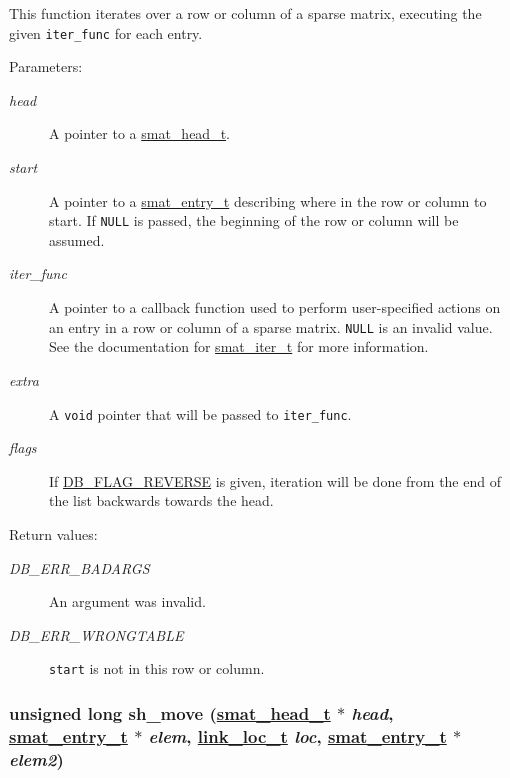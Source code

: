 This function iterates over a row or column of a sparse matrix, executing the given {\tt iter\_\-func} for each entry.\begin{Desc}
\item[Parameters: ]\par
\begin{description}
\item[{\em 
head}]A pointer to a \hyperlink{group__dbprim__smat_a1}{smat\_\-head\_\-t}. \item[{\em 
start}]A pointer to a \hyperlink{group__dbprim__smat_a2}{smat\_\-entry\_\-t} describing where in the row or column to start. If {\tt NULL} is passed, the beginning of the row or column will be assumed. \item[{\em 
iter\_\-func}]A pointer to a callback function used to perform user-specified actions on an entry in a row or column of a sparse matrix. {\tt NULL} is an invalid value. See the documentation for \hyperlink{group__dbprim__smat_a4}{smat\_\-iter\_\-t} for more information. \item[{\em 
extra}]A {\tt void} pointer that will be passed to {\tt iter\_\-func}. \item[{\em 
flags}]If \hyperlink{group__dbprim_a4}{DB\_\-FLAG\_\-REVERSE} is given, iteration will be done from the end of the list backwards towards the head.\end{description}
\end{Desc}
\begin{Desc}
\item[Return values: ]\par
\begin{description}
\item[{\em 
DB\_\-ERR\_\-BADARGS}]An argument was invalid. \item[{\em 
DB\_\-ERR\_\-WRONGTABLE}]{\tt start} is not in this row or column. \end{description}
\end{Desc}
\hypertarget{group__dbprim__smat_a18}{
\subsubsection[sh\_\-move]{\setlength{\rightskip}{0pt plus 5cm}unsigned long sh\_\-move (\hyperlink{group__dbprim__smat_a1}{smat\_\-head\_\-t} $\ast$ {\em head}, \hyperlink{group__dbprim__smat_a2}{smat\_\-entry\_\-t} $\ast$ {\em elem}, \hyperlink{group__dbprim__link_a4}{link\_\-loc\_\-t} {\em loc}, \hyperlink{group__dbprim__smat_a2}{smat\_\-entry\_\-t} $\ast$ {\em elem2})}}
\label{group__dbprim__smat_a18}


